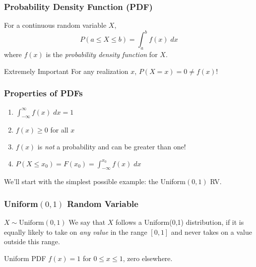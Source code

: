 \documentclass[handout]{beamer}
\begin{document}
\begin{frame}
\frametitle{Probability Density Function (PDF)}
For a continuous random variable $X$, 
	$$P(a \leq X \leq b) = \int_a^b f(x) \; dx$$
where $f(x)$ is the \emph{probability density function} for $X$. 
\vspace{2em}

\begin{alertblock}{Extremely Important}
For any realization $x$, $P(X=x) = 0 \neq f(x)$!
\end{alertblock}
\end{frame}
\begin{frame}
\frametitle{Properties of PDFs}
\begin{enumerate}
\item $\int_{-\infty}^\infty f(x) \; dx = 1$ 
\item $f(x) \geq 0$ for all $x$
\item $f(x)$ is \emph{not} a probability and can be greater than one!
\item $P(X\leq x_0) = F(x_0) = \int_{-\infty}^{x_0} f(x) \; dx $
\end{enumerate}
\end{frame}
\begin{frame}
	\begin{center}
	\huge
		We'll start with the simplest possible example: the Uniform$(0,1)$ RV.
	\end{center} 
\end{frame}


\begin{frame}
\frametitle{Uniform$(0,1)$ Random Variable}

\begin{block}{$X \sim \mbox{Uniform}(0,1)$}
We say that $X$ follows a Uniform(0,1) distribution, if it is equally likely to take on \emph{any value} in the range $[0,1]$ and never takes on a value outside this range.
\end{block}

\begin{block}{Uniform PDF}
$f(x) = 1$ for $0\leq x \leq 1$, zero elsewhere.
\end{block}

\end{frame}
\end{document}
